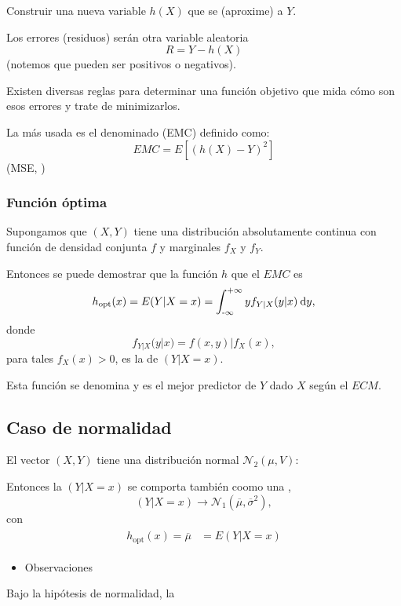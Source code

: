  Construir una nueva variable $h(X)$ que se  (aproxime) a $Y$.

Los errores (residuos) serán otra variable aleatoria \[ R=Y-h(X) \](notemos que pueden ser positivos o negativos).

Existen diversas reglas para determinar una función objetivo que mida cómo son esos errores y trate de minimizarlos.

La más usada es el denominado  (EMC) definido como: \[ EMC=E\left[(h(X)-Y)^2\right] \] (MSE, )

\subsubsection{Función óptima}

Supongamos que $(X,Y)$ tiene una distribución absolutamente continua con función de densidad conjunta $f$ y marginales $f_X$ y $f_Y$.

Entonces se puede demostrar que la función $h$ que  el $EMC$ es \[ h_{\mathrm{opt}}(x)=E(Y|X=x)=\operatorname{\int_{-\infty}^{+\infty}} yf_{Y|X}(y|x)\:\mathrm{d}y, \]donde\[ f_{Y|X}(y|x)=f(x,y)|f_X(x), \] para tales $f_X(x)>0$, es la  de $(Y|X=x)$.

Esta función se denomina  y es el mejor predictor de $Y$ dado $X$ según el $ECM$.
\subsection{Caso de normalidad}
El vector $(X,Y)$ tiene una distribución normal $\mathcal{N}_2(\mu,V)$:

Entonces la  $(Y|X=x)$ se comporta también coomo una , \[ (Y|X=x)\longrightarrow \mathcal{N}_1(\overline{\mu},\overline{\sigma}^2), \] con \[ \begin{array}{c}
\begin{aligned}
h_{\mathrm{opt}}(x)=\overline{\mu}&=E(Y|X=x)
\end{aligned}
\end{array} \]

\begin{itemize}[label=\color{red}\textbullet, leftmargin=*]
	\item \color{lightblue}Observaciones
\end{itemize}
Bajo la hipótesis de normalidad, la 
